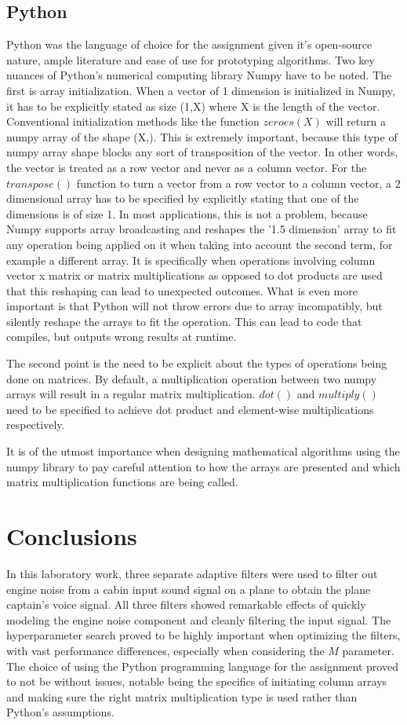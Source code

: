 \documentclass[10pt,a4paper,twocolumn]{article}
\begin{document}
\subsection*{Python}
Python was the language of choice for the assignment given it's open-source nature, ample literature and ease of use for prototyping algorithms. Two key nuances of Python's numerical computing library Numpy have to be noted. The first is array initialization. When a vector of 1 dimension is initialized in Numpy, it has to be explicitly stated as size (1,X) where X is the length of the vector. Conventional initialization methods like the function $zeroes(X)$ will return a numpy array of the shape (X,). This is extremely important, because this type of numpy array shape blocks any sort of transposition of the vector. In other words, the vector is treated as a row vector and never as a column vector. For the $transpose()$ function to turn a vector from a row vector to a column vector, a 2 dimensional array has to be specified by explicitly stating that one of the dimensions is of size 1. In most applications, this is not a problem, because Numpy supports array broadcasting and reshapes the '1.5 dimension' array to fit any operation being applied on it when taking into account the second term, for example a different array. It is specifically when operations involving column vector x matrix or matrix multiplications as opposed to dot  products are used that this reshaping can lead to unexpected outcomes. What is even more important is that Python will not throw errors due to array incompatibly, but silently reshape the arrays to fit the operation. This can lead to code that compiles, but outputs wrong results at runtime.


The second point is the need to be explicit about the types of operations being done on matrices. By default, a multiplication operation between two numpy arrays will result in a regular matrix multiplication. $dot()$ and $multiply()$ need to be specified to achieve dot product and element-wise multiplications respectively.

It is of the utmost importance when designing mathematical algorithms using the numpy library to pay careful attention to how the arrays are presented and which matrix multiplication functions are being called.

\section*{Conclusions}
In this laboratory work, three separate adaptive filters were used to filter out engine noise from a cabin input sound signal on a plane to obtain the plane captain's voice signal. All three filters showed remarkable effects of quickly modeling the engine noise component and cleanly filtering the input signal. The hyperparameter search proved to be highly important when optimizing the filters, with vast performance differences, especially when considering the $M$ parameter. The choice of using the Python programming language for the assignment proved to not be without issues, notable being the specifics of initiating column arrays and making sure the right matrix multiplication type is used rather than Python's assumptions. 
\end{document}
